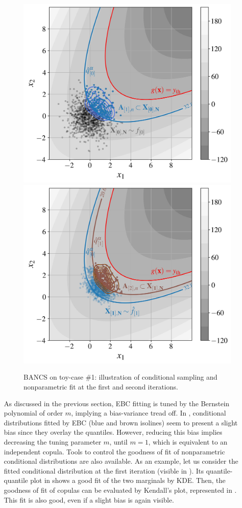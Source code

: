 \begin{figure}[!ht]
    \centering
    \includegraphics[width=0.48\linewidth]{part3/figures/BANCS/bancs_illustration1.jpg}
    \includegraphics[width=0.48\linewidth]{part3/figures/BANCS/bancs_illustration2.jpg}
    \caption{BANCS on toy-case \#1: illustration of conditional sampling and nonparametric fit at the first and second iterations.}
    \label{fig:bancs_illustration1}
\end{figure}

As discussed in the previous section, EBC fitting is tuned by the Bernstein polynomial of order $m$, implying a bias-variance tread off. 
In , conditional distributions fitted by EBC (blue and brown isolines) seem to present a slight bias since they overlay the quantiles. 
However, reducing this bias implies decreasing the tuning parameter $m$, until $m=1$, which is equivalent to an independent copula. 
Tools to control the goodness of fit of nonparametric conditional distributions are also available. 
As an example, let us consider the fitted conditional distribution at the first iteration (visible in ). 
Its quantile-quantile plot in  shows a good fit of the two marginals by KDE. 
Then, the goodness of fit of copulas can be evaluated by Kendall's plot, represented in . 
This fit is also good, even if a slight bias is again visible.

